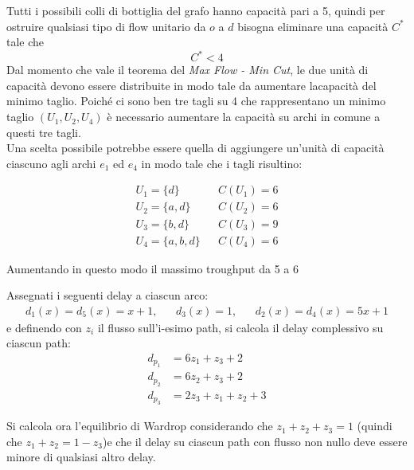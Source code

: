 \documentclass[11pt,largemargins]{homework}
\begin{document}
  \begin{alphaparts}
    \questionpart
    Tutti i possibili colli di bottiglia del grafo hanno capacità pari a 5, quindi per ostruire qualsiasi tipo di flow unitario da \(o\) a \(d\) bisogna eliminare una capacità \(C^*\) tale che
    \begin{equation*}
      C^*<4
    \end{equation*}
    \questionpart
    Dal momento che vale il teorema del \textit{Max Flow - Min Cut}, le due unità di capacità devono essere distribuite in modo tale da aumentare lacapacità del minimo taglio. Poiché ci sono ben tre tagli su 4 che rappresentano un minimo taglio \((U_1, U_2, U_4)\) è necessario aumentare la capacità su archi in comune a questi tre tagli.\\
    Una scelta possibile potrebbe essere quella di aggiungere un'unità di capacità ciascuno agli archi \(e_1\) ed \(e_4\) in modo tale che i tagli risultino:
    
  \begin{align*}
    U_1 = \{d\}\  && C(U_1)=6 \\
    U_2 = \{a, d\} && C(U_2)=6 \\
    U_3 = \{b,d\} && C(U_3)=9 \\
    U_4 = \{a,b,d\} && C(U_4)=6
  \end{align*}

  Aumentando in questo modo il massimo troughput da 5 a 6

  \questionpart
  Assegnati i seguenti delay a ciascun arco:
  \begin{align*}
    d_1(x)=d_5(x)=x+1, && d_3(x)=1, && d_2(x)=d_4(x)=5x+1
  \end{align*}
  e definendo con \(z_i\) il flusso sull'i-esimo path, si calcola il delay complessivo su ciascun path:
  \begin{align*}
    d_{p_1}&=6z_1+z_3+2 \\
    d_{p_2}&=6z_2+z_3+2 \\
    d_{p_3}&=2z_3+z_1+z_2+3
  \end{align*}

  Si calcola ora l'equilibrio di Wardrop considerando che \(z_1+z_2+z_3=1\) (quindi che \(z_1+z_2=1-z_3\))e che il delay su ciascun path con flusso non nullo deve essere minore di qualsiasi altro delay.


\end{alphaparts}
\end{document}

